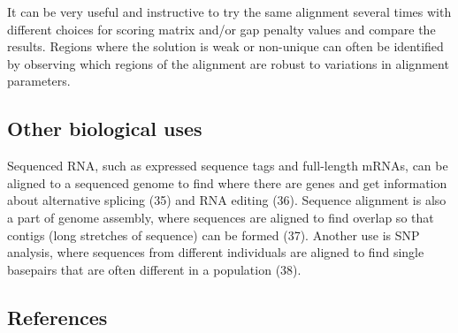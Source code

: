 \documentclass[
]{book}
\begin{document}
It can be very useful and instructive to try the same alignment several times with different choices for scoring matrix and/or gap penalty values and compare the results. Regions where the solution is weak or non-unique can often be identified by observing which regions of the alignment are robust to variations in alignment parameters.

\hypertarget{other-biological-uses}{%
\subsection{Other biological uses}\label{other-biological-uses}}

Sequenced RNA, such as expressed sequence tags and full-length mRNAs, can be aligned to a sequenced genome to find where there are genes and get information about alternative splicing (35) and RNA editing (36). Sequence alignment is also a part of genome assembly, where sequences are aligned to find overlap so that contigs (long stretches of sequence) can be formed (37). Another use is SNP analysis, where sequences from different individuals are aligned to find single basepairs that are often different in a population (38).

\hypertarget{references-2}{%
\subsection{References}\label{references-2}}
\end{document}
